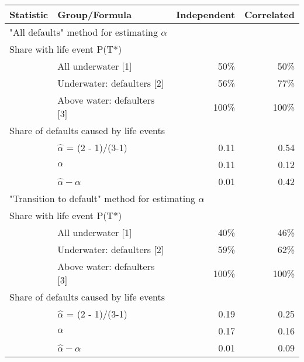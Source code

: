 \begin{tabular}{llrr}

Statistic & Group/Formula & Independent & Correlated \\ 
\midrule
\multicolumn{4}{l}{"All defaults" method for estimating $ \alpha $} \\ 
\midrule
\multicolumn{2}{l}{Share with life event P(T*)}  &  &  \\ 
 & All underwater [1] & 50\% & 50\% \\ 
 & Underwater: defaulters [2] & 56\% & 77\% \\ 
 & Above water: defaulters [3] & 100\% & 100\% \\ 
\multicolumn{2}{l}{Share of defaults caused by life events}  &  &  \\ 
 & $ \hat{\alpha}$ = (2 - 1)/(3-1) & 0.11 & 0.54 \\ 
 & $ \alpha $ & 0.11 & 0.12 \\ 
 & $ \hat{\alpha} - \alpha $ & 0.01 & 0.42 \\ 
\midrule
\multicolumn{4}{l}{"Transition to default" method for estimating $ \alpha $} \\ 
\midrule
\multicolumn{2}{l}{Share with life event P(T*)}  &  &  \\ 
 & All underwater [1] & 40\% & 46\% \\ 
 & Underwater: defaulters [2] & 59\% & 62\% \\ 
 & Above water: defaulters [3] & 100\% & 100\% \\ 
\multicolumn{2}{l}{Share of defaults caused by life events}  &  &  \\ 
 & $ \hat{\alpha}$ = (2 - 1)/(3-1) & 0.19 & 0.25 \\ 
 & $ \alpha $ & 0.17 & 0.16 \\ 
 & $ \hat{\alpha} - \alpha $ & 0.01 & 0.09 \\ 
\bottomrule
\end{tabular}

